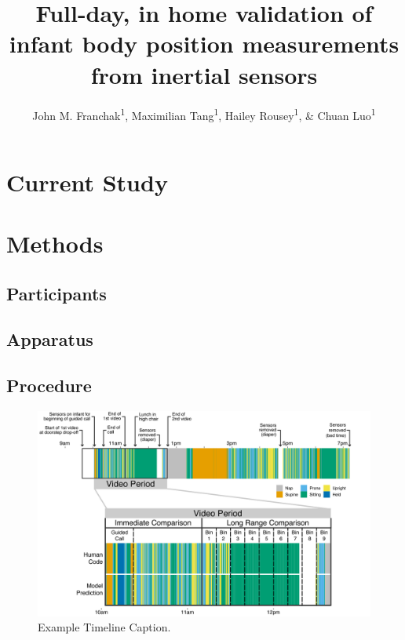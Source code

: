 \documentclass[
  man]{apa6}
\title{Full-day, in home validation of infant body position measurements from inertial sensors}
\author{John M. Franchak\textsuperscript{1}, Maximilian Tang\textsuperscript{1}, Hailey Rousey\textsuperscript{1}, \& Chuan Luo\textsuperscript{1}}
\date{}
\affiliation{\phantom{0}}
\begin{document}
\maketitle

\hypertarget{current-study}{%
\section{Current Study}\label{current-study}}

\hypertarget{methods}{%
\section{Methods}\label{methods}}

\hypertarget{participants}{%
\subsection{Participants}\label{participants}}

\hypertarget{apparatus}{%
\subsection{Apparatus}\label{apparatus}}

\hypertarget{procedure}{%
\subsection{Procedure}\label{procedure}}

\begin{figure}

{\centering \includegraphics[width=0.9\linewidth]{figures/timeline} 

}

\caption{Example Timeline Caption.}\label{fig:exemplartimeline}
\end{figure}
\end{document}
